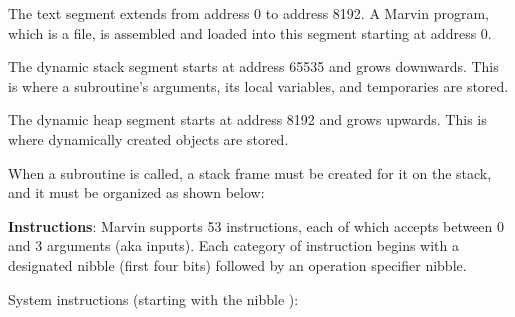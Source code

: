 \documentclass{article}
\begin{document}
\smallskip

\noindent The text segment extends from address 0 to address 8192. A Marvin program, which is a  file, is assembled and loaded into this segment starting at address 0.

\bigskip

\noindent The dynamic stack segment starts at address 65535 and grows downwards. This is where a subroutine's arguments, its local variables, and temporaries are stored.

\bigskip

\noindent The dynamic heap segment starts at address 8192 and grows upwards. This is where dynamically created objects are stored.
\bigskip

\noindent When a subroutine is called, a stack frame must be created for it on the stack, and it must be organized as shown below:

\smallskip

\begin{center}
\end{center}

\newpage

\noindent \textbf{Instructions}: Marvin supports 53 instructions, each of which accepts between 0 and 3 arguments (aka inputs). Each category of instruction begins with a designated nibble (first four bits) followed by an operation specifier nibble.

\bigskip

\noindent System instructions (starting with the nibble ):

\smallskip
\end{document}
